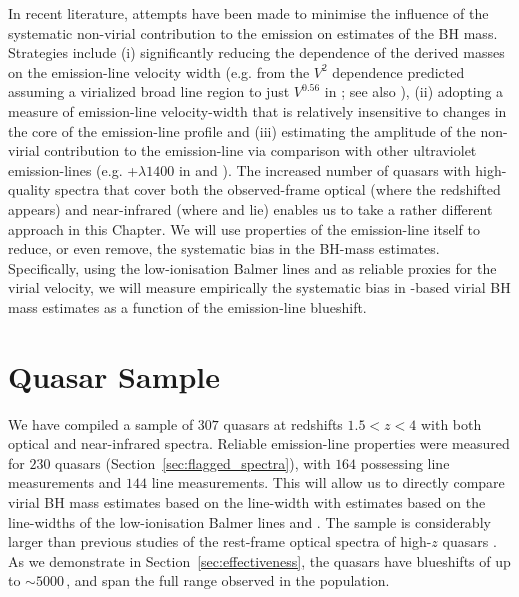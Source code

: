 In recent literature, attempts have been made to minimise the influence of the systematic non-virial contribution to the  emission on estimates of the BH mass. 
Strategies include (i) significantly reducing the dependence of the derived masses on the emission-line velocity width (e.g. from the $V^2$ dependence predicted assuming a virialized broad line region to just $V^{0.56}$ in \citealt{park13}; see also \citealt{shen12}), (ii) adopting a measure of emission-line velocity-width that is relatively insensitive to changes in the core of the emission-line profile \citep[e.g.][]{denney13} and (iii) estimating the amplitude of the non-virial contribution to the  emission-line via comparison with other ultraviolet emission-lines (e.g. +$\lambda$$1400$ in \citealt{runnoe13} and \citealt{brotherton15}).
The increased number of quasars with high-quality spectra that cover both the observed-frame optical (where the redshifted  appears) and near-infrared (where \hb and \ha lie) enables us to take a rather different approach in this Chapter.
We will use properties of the  emission-line itself to reduce, or even remove, the systematic bias in the BH-mass estimates. 
Specifically, using the low-ionisation Balmer lines \ha and \hb as reliable proxies for the virial velocity, we will measure empirically the systematic bias in -based virial BH mass estimates as a function of the  emission-line blueshift.

\section{Quasar Sample}

We have compiled a sample of $307$ quasars at redshifts $1.5 < z < 4$ with both optical and near-infrared spectra.  
Reliable emission-line properties were measured for $230$ quasars (Section~\ref{sec:flagged_spectra}), with $164$ possessing \ha line measurements and $144$ \hb line measurements.  
This will allow us to directly compare virial BH mass estimates based on the  line-width with estimates based on the line-widths of the low-ionisation Balmer lines \ha and \hbns.  
The sample is considerably larger than previous studies of the rest-frame optical spectra of high-$z$ quasars \citep[e.g.][]{shen12}. 
As we demonstrate in Section~\ref{sec:effectiveness}, the quasars have  blueshifts of up to $\sim5000$\,\kms, and span the full range observed in the population. 

